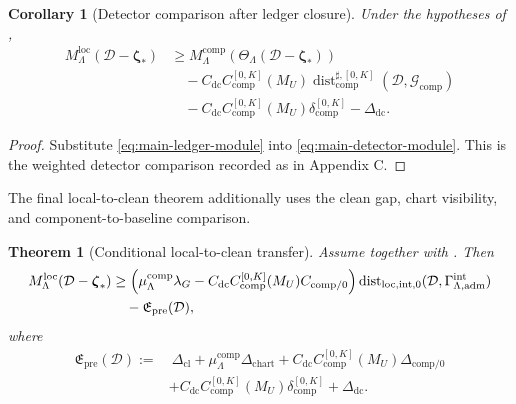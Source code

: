 \documentclass[11pt]{article}
\numberwithin{equation}{section}
\newtheorem{theorem}{Theorem}[section]
\newtheorem{corollary}[corollary]{Corollary}
\theoremstyle{definition}
\theoremstyle{remark}
\newcommand{\loc}{\mathrm{loc}}
\newcommand{\intg}{\mathrm{int}}
\newcommand{\adm}{\mathrm{adm}}
\newcommand{\cl}{\mathrm{cl}}
\newcommand{\comp}{\mathrm{comp}}
\newcommand{\Dist}{\operatorname{dist}}
\newcommand{\calD}{\mathcal D}
\newcommand{\calG}{\mathcal G}
\newcommand{\bzeta}{\boldsymbol\zeta}
\begin{document}
\begin{corollary}[Detector comparison after ledger closure]\label{cor:main-detector-after-ledger}
Under the hypotheses of ,
\begin{equation}\label{eq:main-detector-after-ledger}
\begin{aligned}
        M_{\Lambda}^{\loc}(\calD-\bzeta_*)
        &\ge
        M_{\Lambda}^{\comp}(\Theta_{\Lambda}(\calD-\bzeta_*))\\
        &\quad
        -
        C_{\mathrm{dc}}C_{\comp}^{[0,K]}(M_U)
        \Dist_{\comp}^{\sharp,[0,K]}(\calD,\calG_{\comp})\\
        &\quad
        -
        C_{\mathrm{dc}}C_{\comp}^{[0,K]}(M_U)
        \delta_{\comp}^{[0,K]}
        -
        \Delta_{\mathrm{dc}}.
\end{aligned}
\end{equation}
\end{corollary}

\begin{proof}
Substitute \eqref{eq:main-ledger-module} into \eqref{eq:main-detector-module}.  This is the weighted detector comparison recorded as  in Appendix C.
\end{proof}

The final local-to-clean theorem additionally uses the clean gap, chart visibility, and component-to-baseline comparison.

\begin{theorem}[Conditional local-to-clean transfer]\label{thm:main-local-to-clean-module}
Assume  together with .  Then
\begin{equation}\label{eq:main-local-to-clean-module}
\begin{aligned}
        M_{\Lambda}^{\loc}(\calD-\bzeta_*)
        &\ge
        \Bigl(
        \mu_\Lambda^{\comp}\lambda_G
        -
        C_{\mathrm{dc}}C_{\comp}^{[0,K]}(M_U)C_{\comp/0}
        \Bigr)
        \Dist_{\loc,\intg,0}(\calD,\Gamma^{\intg}_{\Lambda,\adm})\\
        &\quad
        -
        \mathfrak E_{\mathrm{pre}}(\calD),
\end{aligned}
\end{equation}
where
\[
\begin{aligned}
        \mathfrak E_{\mathrm{pre}}(\calD)
        :=
        &\ \Delta_{\cl}
        +\mu_\Lambda^{\comp}\Delta_{\mathrm{chart}}
        +C_{\mathrm{dc}}C_{\comp}^{[0,K]}(M_U)\Delta_{\comp/0}\\
        &+C_{\mathrm{dc}}C_{\comp}^{[0,K]}(M_U)\delta_{\comp}^{[0,K]}
        +\Delta_{\mathrm{dc}}.
\end{aligned}
\]
\end{theorem}
\end{document}
